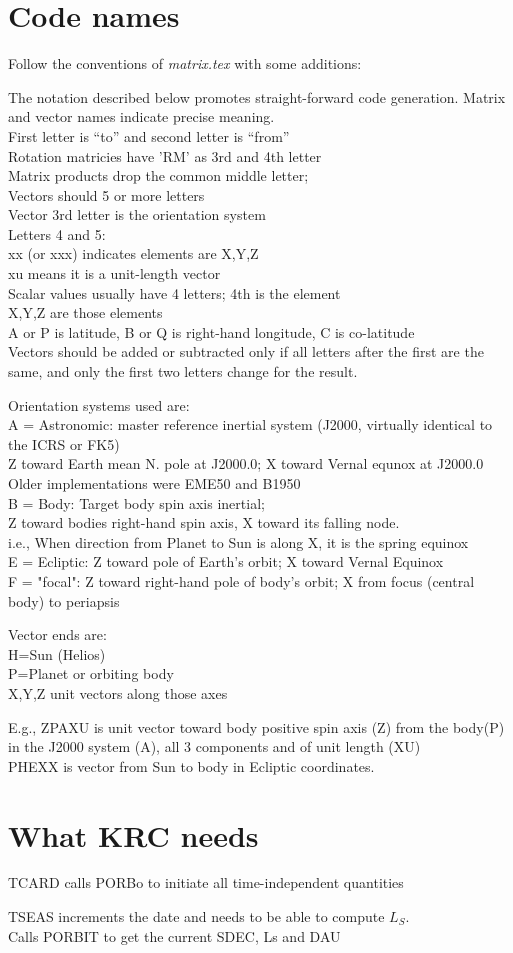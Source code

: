 \documentclass[draft]{article}
\newcommand{\qi}{\\ \hspace*{2.em}}      %
\newcommand{\qii}{\\ \hspace*{4.em}}     %
\newcommand{\qiii}{\\ \hspace*{6.em}}    %
\newcommand{\nf}{\textit}  %
\begin{document}
\section{Code names \label{code} }
Follow the conventions of \nf{matrix.tex} with some additions:

The notation described below promotes straight-forward code generation.  Matrix and vector names indicate precise meaning.
\\ First letter is ``to'' and second letter is ``from''
\qi  Rotation matricies have 'RM' as 3rd and 4th letter
\qi  Matrix products drop the common middle letter;
\qi  Vectors should 5 or more letters
\qi  Vector 3rd letter is the orientation system
\qii Letters 4 and 5:
\qiii xx (or xxx) indicates elements are X,Y,Z
\qiii xu means it is a unit-length vector
\qi  Scalar values usually have 4 letters; 4th is the element
\qiii X,Y,Z are those elements 
\qiii A or P is latitude, B or Q is right-hand longitude, C is co-latitude 
\qi  Vectors should be added or subtracted only if all letters after the first
  are the same, and only the first two letters change for the result.

Orientation systems used are:
\qi A = Astronomic: master reference inertial system (J2000, virtually identical to the ICRS or FK5)
\qii Z toward Earth  mean N. pole at J2000.0; X toward Vernal equnox at J2000.0 
\qiii Older implementations were EME50 and B1950
\qi B = Body:       Target body spin axis inertial; 
\qii Z toward bodies right-hand spin axis, X toward its falling node.
\qiii i.e., When direction from Planet to Sun is along X, it is the spring equinox 
\qi E = Ecliptic:  Z toward pole of Earth's orbit;  X toward Vernal Equinox
\qi F = "focal":  Z toward right-hand pole of body's orbit;  X from focus (central body) to periapsis

Vector ends are:
\qi H=Sun (Helios) 
\qi P=Planet or orbiting body
\qi X,Y,Z unit vectors along those axes

E.g., ZPAXU is unit vector toward body positive spin axis (Z) from the body(P) in the J2000 system (A), all 3 components and of unit length (XU)
\qi PHEXX is vector from Sun to body in Ecliptic coordinates.
 
\section{What KRC needs}

TCARD calls PORBo to initiate all time-independent quantities

TSEAS increments the date and needs to be able to compute $L_S$. 
\qi Calls PORBIT to get the current  SDEC, Ls and DAU
\end{document}
